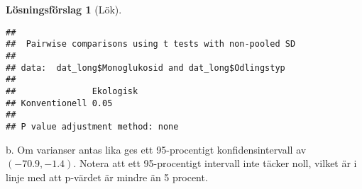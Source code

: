 \documentclass[
]{book}
\newenvironment{Shaded}{\begin{snugshade}}{\end{snugshade}}
\newcommand{\AttributeTok}[1]{\textcolor[rgb]{0.77,0.63,0.00}{#1}}
\newcommand{\FunctionTok}[1]{\textcolor[rgb]{0.00,0.00,0.00}{#1}}
\newcommand{\NormalTok}[1]{#1}
\newcommand{\SpecialCharTok}[1]{\textcolor[rgb]{0.00,0.00,0.00}{#1}}
\newcommand{\StringTok}[1]{\textcolor[rgb]{0.31,0.60,0.02}{#1}}
\theoremstyle{definition}
\theoremstyle{definition}
\theoremstyle{definition}
\theoremstyle{definition}
\newtheorem{hypothesis}{Lösningsförslag}[chapter]
\theoremstyle{remark}
\begin{document}
\begin{hypothesis}[Lök]
\begin{Shaded}
\end{Shaded}

\begin{verbatim}
## 
##  Pairwise comparisons using t tests with non-pooled SD 
## 
## data:  dat_long$Monoglukosid and dat_long$Odlingstyp 
## 
##               Ekologisk
## Konventionell 0.05     
## 
## P value adjustment method: none
\end{verbatim}

b. Om varianser antas lika ges ett 95-procentigt konfidensintervall av \((-70.9, -1.4)\). Notera att ett 95-procentigt intervall inte täcker noll, vilket är i linje med att p-värdet är mindre än 5 procent.
\end{hypothesis}
\end{document}
